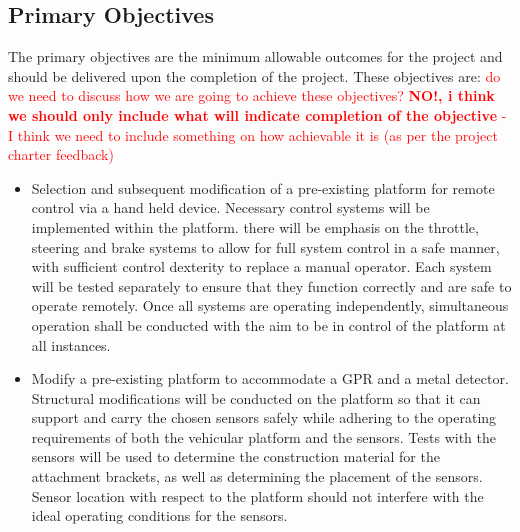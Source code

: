 \documentclass[main.tex]{subfiles}
\begin{document}
 
\subsection{Primary Objectives}
The primary objectives are the minimum allowable outcomes for the project and should be delivered upon the completion of the project. These objectives are:
\textcolor{red}{do we need to discuss how we are going to achieve these objectives? \textbf{NO!, i think we should only include what will indicate completion of the objective } - I think we need to include something on how achievable it is (as per the project charter feedback)}
\begin{itemize}
\item Selection and subsequent modification of a pre-existing platform for remote control via a hand held device. Necessary control systems will be implemented within the platform. there will be emphasis on the throttle, steering and brake systems to allow for full system control in a safe manner, with sufficient control dexterity to replace a manual operator. Each system will be tested separately to ensure that they function correctly and are safe to operate remotely. Once all systems are operating independently, simultaneous operation shall be conducted with the aim to be in control of the platform at all instances. %

\item Modify a pre-existing platform to accommodate a GPR and a metal detector. Structural modifications will be conducted on the platform so that it can support and carry the chosen sensors safely while adhering to the operating requirements of both the vehicular platform and the sensors. %
Tests with the sensors will be used to determine the construction material for the attachment brackets, as well as determining the placement of the sensors. Sensor location with respect to the platform should not interfere with the ideal operating conditions for the sensors.


\end{itemize}
\end{document}
